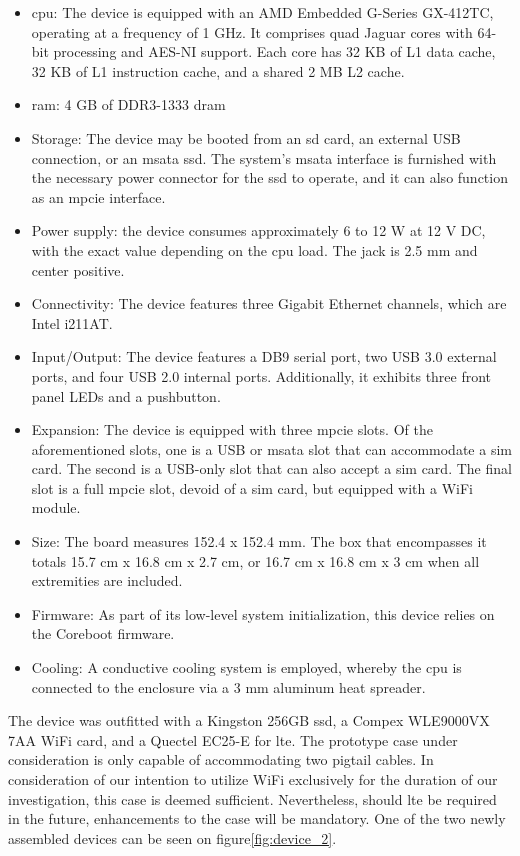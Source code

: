 \begin{itemize}
    \item \gls{cpu}: The device is equipped with an AMD Embedded G-Series GX-412TC, operating at a frequency of 1 GHz. It comprises quad Jaguar cores with 64-bit processing and AES-NI support. Each core has 32 KB of L1 data cache, 32 KB of L1 instruction cache, and a shared 2 MB L2 cache.
    \item \gls{ram}: 4 GB of DDR3-1333 \gls{dram}
    \item Storage: The device may be booted from an \gls{sd} card, an external USB connection, or an \gls{msata} \gls{ssd}. The system's \gls{msata} interface is furnished with the necessary power connector for the \gls{ssd} to operate, and it can also function as an \gls{mpcie} interface.
    \item Power supply: the device consumes approximately 6 to 12 W at 12 V DC, with the exact value depending on the \gls{cpu} load. The jack is 2.5 mm and center positive.
    \item Connectivity: The device features three Gigabit Ethernet channels, which are Intel i211AT.
    \item Input/Output: The device features a DB9 serial port, two USB 3.0 external ports, and four USB 2.0 internal ports. Additionally, it exhibits three front panel LEDs and a pushbutton.
    \item Expansion: The device is equipped with three \gls{mpcie} slots. Of the aforementioned slots, one is a USB or \gls{msata} slot that can accommodate a \gls{sim} card. The second is a USB-only slot that can also accept a \gls{sim} card. The final slot is a full \gls{mpcie} slot, devoid of a \gls{sim} card, but equipped with a WiFi module.
    \item Size: The board measures 152.4 x 152.4 mm. The box that encompasses it totals 15.7 cm x 16.8 cm x 2.7 cm, or 16.7 cm x 16.8 cm x 3 cm when all extremities are included.
    \item Firmware: As part of its low-level system initialization, this device relies on the Coreboot firmware.
    \item Cooling: A conductive cooling system is employed, whereby the \gls{cpu} is connected to the enclosure via a 3 mm aluminum heat spreader.
\end{itemize}

The device was outfitted with a Kingston 256GB \gls{ssd}, a Compex WLE9000VX 7AA WiFi card, and a Quectel EC25-E for \gls{lte}. The prototype case under consideration is only capable of accommodating two pigtail cables. In consideration of our intention to utilize WiFi exclusively for the duration of our investigation, this case is deemed sufficient. Nevertheless, should \gls{lte} be required in the future, enhancements to the case will be mandatory. One of the two newly assembled devices can be seen on figure\ref{fig:device_2}.


